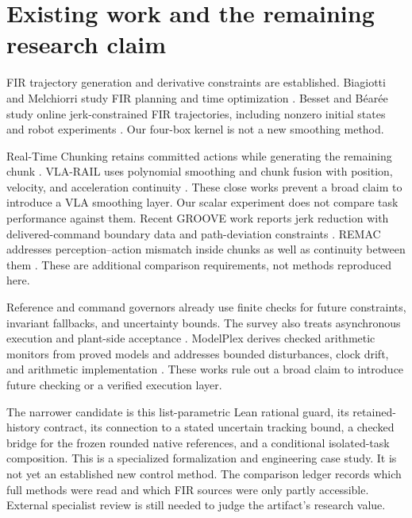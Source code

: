 \documentclass[11pt,letterpaper]{article}
\begin{document}
\newpage


\newpage


\newpage


\newpage
{\small
\section{Existing work and the remaining research claim}
FIR trajectory generation and derivative constraints are established. Biagiotti and Melchiorri study FIR planning and time optimization \cite{fir2012,fir2019}. Besset and B\'ear\'ee study online jerk-constrained FIR trajectories, including nonzero initial states and robot experiments \cite{fir2017}. Our four-box kernel is not a new smoothing method.

Real-Time Chunking retains committed actions while generating the remaining chunk \cite{rtc}. VLA-RAIL uses polynomial smoothing and chunk fusion with position, velocity, and acceleration continuity \cite{rail}. These close works prevent a broad claim to introduce a VLA smoothing layer. Our scalar experiment does not compare task performance against them. Recent GROOVE work reports jerk reduction with delivered-command boundary data and path-deviation constraints \cite{groove}. REMAC addresses perception--action mismatch inside chunks as well as continuity between them \cite{remac}. These are additional comparison requirements, not methods reproduced here.

Reference and command governors already use finite checks for future constraints, invariant fallbacks, and uncertainty bounds. The survey also treats asynchronous execution and plant-side acceptance \cite{governors}. ModelPlex derives checked arithmetic monitors from proved models and addresses bounded disturbances, clock drift, and arithmetic implementation \cite{modelplex}. These works rule out a broad claim to introduce future checking or a verified execution layer.

The narrower candidate is this list-parametric Lean rational guard, its retained-history contract, its connection to a stated uncertain tracking bound, a checked bridge for the frozen rounded native references, and a conditional isolated-task composition. This is a specialized formalization and engineering case study. It is not yet an established new control method. The comparison ledger records which full methods were read and which FIR sources were only partly accessible. External specialist review is still needed to judge the artifact's research value.

}
\end{document}
